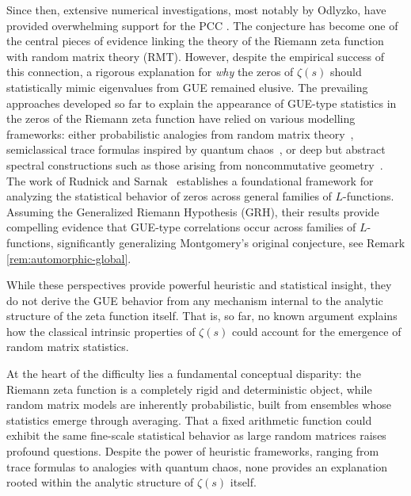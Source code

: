 \documentclass[12pt,reqno]{amsart}
\theoremstyle{plain}
\theoremstyle{definition}
\theoremstyle{remark}
\begin{document}
Since then, extensive numerical investigations, most notably by Odlyzko, have provided overwhelming support for the PCC \cite{Odlyzko1992,OdlyzkoSchoenhage1988,Od}.   The conjecture has become one of the central pieces of evidence linking the theory of the Riemann zeta function with random matrix theory (RMT). However, despite the empirical success of this connection, a rigorous explanation for \emph{why} the zeros of $\zeta(s)$ should statistically mimic eigenvalues from GUE remained elusive. The prevailing approaches developed so far to explain the appearance of GUE-type statistics in the zeros of the Riemann zeta function have relied on various modelling frameworks: either probabilistic analogies from random matrix theory~\cite{KeatingSnaith2000,KatzSarnak1999,FyodorovHiaryKeating2012}, semiclassical trace formulas inspired by quantum chaos~\cite{BerryKeating1999,BogomolnyKeating1995}, or deep but abstract spectral constructions such as those arising from noncommutative geometry~\cite{Connes1999}. 
The work of Rudnick and Sarnak~\cite{RS1996} establishes a foundational framework for analyzing the statistical behavior of zeros across general families of \( L \)-functions. Assuming the Generalized Riemann Hypothesis (GRH), their results provide compelling evidence that GUE-type correlations occur across families of \( L \)-functions, significantly generalizing Montgomery's original conjecture, see Remark \ref{rem:automorphic-global}.



 While these perspectives provide powerful heuristic and statistical insight, they do not derive the GUE behavior from any mechanism internal to the analytic structure of the zeta function itself. That is, so far, no known argument explains how the classical intrinsic properties of \( \zeta(s) \) could account for the emergence of random matrix statistics.

At the heart of the difficulty lies a fundamental conceptual disparity: the Riemann zeta function is a completely rigid and deterministic object, while random matrix models are inherently probabilistic, built from ensembles whose statistics emerge through averaging. That a fixed arithmetic function could exhibit the same fine-scale statistical behavior as large random matrices raises profound questions. Despite the power of heuristic frameworks, ranging from trace formulas to analogies with quantum chaos, none provides an explanation rooted within the analytic structure of \( \zeta(s) \) itself. 
\end{document}
